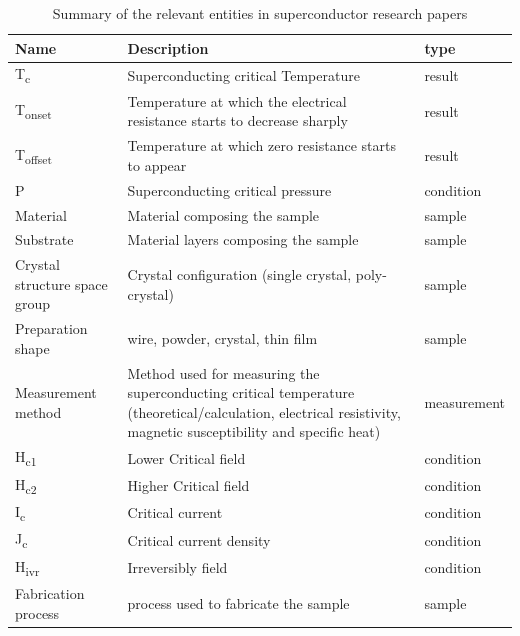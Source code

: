 \documentclass[a4paper,10pt]{article}
\begin{document}
\begin{table}[h!]
    \centering
    \begin{tabular}{ | m{5em} | m{8cm}| m{5em} | } 
    \hline
        Name & Description & type \\ [0.5ex] 
    \hline\hline
        T\textsubscript{c} & Superconducting critical Temperature & result\\ 
    \hline
        T\textsubscript{onset} & Temperature at which the electrical resistance starts to decrease sharply & result\\
    \hline 
        T\textsubscript{offset} & Temperature at which zero resistance starts to appear & result\\ 
    \hline
        P & Superconducting critical pressure & condition\\
    \hline
        Material & Material composing the sample & sample \\
    \hline  
        Substrate & Material layers composing the sample & sample\\
    \hline
        Crystal structure space group & Crystal configuration (single crystal, poly-crystal) & sample \\
    \hline 
        Preparation shape & wire, powder, crystal, thin film & sample\\
    \hline 
        Measurement method & Method used for measuring the superconducting critical temperature (theoretical/calculation, electrical resistivity, magnetic susceptibility and specific heat) & measurement\\
    \hline
        H\textsubscript{c1} & Lower Critical field & condition\\ 
    \hline
        H\textsubscript{c2} & Higher Critical field & condition\\ 
    \hline
        I\textsubscript{c} & Critical current & condition\\
    \hline
        J\textsubscript{c} & Critical current density & condition\\ 
    \hline
        H\textsubscript{ivr} & Irreversibly field & condition\\
    \hline    
        Fabrication process & process used to fabricate the sample & sample\\
    \hline    
    \end{tabular}
    \caption{Summary of the relevant entities in superconductor research papers}
    \label{table:summary-entities-superconductor}
\end{table}
\end{document}
